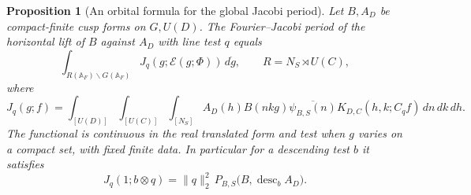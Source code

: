 \documentclass[a4paper,11pt]{article}
\newtheorem{proposition}{Proposition}[section]
\theoremstyle{definition}
\theoremstyle{remark}
\numberwithin{equation}{section}
\begin{document}
\begin{proposition}[An orbital formula for the global Jacobi period]\leavevmode
\label{prop:jacorbit266}
Let \(B,A_D\) be compact-finite cusp forms on \(G,U(D)\).
The Fourier--Jacobi period of the horizontal lift of \(B\)
against \(A_D\) with line test \(q\) equals
\[
  \int_{R(\mathbb A_F)\backslash G(\mathbb A_F)}
       J_q(g;\mathcal E(g;\Phi))\,d\dot g,\qquad
       R=N_S\rtimes U(C),
\]
where
\[
 J_q(g;f)=\int_{[U(D)]}\int_{[U(C)]}\int_{[N_S]}
 A_D(h)B(nk g)\overline{\psi_{B,S}(n)}
             K_{D,C}(h,k;C_q f)\,dn\,dk\,dh .
\]
The functional is continuous in the real translated form
and test when \(g\) varies on a compact set, with fixed finite
data. In particular for a descending test \(b\) it satisfies
\[
     J_q(1;b\otimes q)=\|q\|_2^2\,
           P_{B,S}\big(B,\operatorname{desc}_b A_D\big).
\]
\end{proposition}
\end{document}
